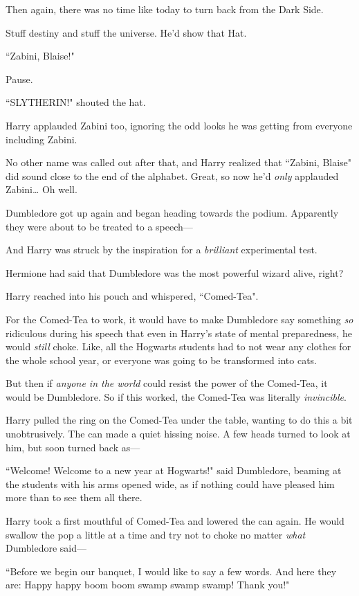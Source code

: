 Then again, there was no time like today to turn back from the Dark Side.

Stuff destiny and stuff the universe. He'd show that Hat.

``Zabini, Blaise!"

Pause.

``SLYTHERIN!" shouted the hat.

Harry applauded Zabini too, ignoring the odd looks he was getting from everyone including Zabini.

No other name was called out after that, and Harry realized that ``Zabini, Blaise" did sound close to the end of the alphabet. Great, so now he'd \emph{only} applauded Zabini{\ldots} Oh well.

Dumbledore got up again and began heading towards the podium. Apparently they were about to be treated to a speech—

And Harry was struck by the inspiration for a \emph{brilliant} experimental test.

Hermione had said that Dumbledore was the most powerful wizard alive, right?

Harry reached into his pouch and whispered, ``Comed-Tea".

For the Comed-Tea to work, it would have to make Dumbledore say something \emph{so} ridiculous during his speech that even in Harry's state of mental preparedness, he would \emph{still} choke. Like, all the Hogwarts students had to not wear any clothes for the whole school year, or everyone was going to be transformed into cats.

But then if \emph{anyone in the world} could resist the power of the Comed-Tea, it would be Dumbledore. So if this worked, the Comed-Tea was literally \emph{invincible}.

Harry pulled the ring on the Comed-Tea under the table, wanting to do this a bit unobtrusively. The can made a quiet hissing noise. A few heads turned to look at him, but soon turned back as—

``Welcome! Welcome to a new year at Hogwarts!" said Dumbledore, beaming at the students with his arms opened wide, as if nothing could have pleased him more than to see them all there.

Harry took a first mouthful of Comed-Tea and lowered the can again. He would swallow the pop a little at a time and try not to choke no matter \emph{what} Dumbledore said—

``Before we begin our banquet, I would like to say a few words. And here they are: Happy happy boom boom swamp swamp swamp! Thank you!"

